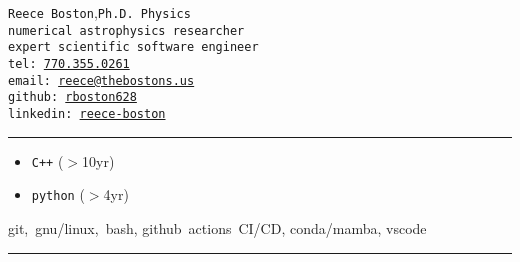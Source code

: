 \documentclass[11pt, letter]{article}
\begin{document}
\begin{multicols}{2}
 \noindent %
 {\tt \huge  Reece Boston},\hfill{\tt \large Ph.D.~Physics}\\
	{\tt\small numerical astrophysics researcher\hfill\drawplanet}\\
	{\tt\small expert scientific software engineer\hfill\drawcalculator\hspace{1pt}\mbox{}}
%
 \columnbreak\\
 \mbox{}\hfill{\tt \small tel: \href{tel:770-355-0261}{770.355.0261}\hphantom{aaaaaaa}}\\  %
 \mbox{}\hfill{\tt \small email: \href{mailto:Reece@thebostons.us}{reece@thebostons.us}}\\ %
 \mbox{}\hfill{\tt \small github: \href{https://github.com/rboston628}{rboston628}\hphantom{aaaaaaaaa}}\\%
 \mbox{}\hfill{\tt \small linkedin: \href{https://www.linkedin.com/in/reece-boston-752046117/}{reece-boston}\hphantom{aaaaaaa}}%
\end{multicols}

\hrule
\vspace{-0.5\baselineskip}
\begin{multicols}{3}
\begin{itemize}
	\item {\tt C++} ($>$10yr)\\
\columnbreak
	\item {\tt python} ($>$4yr)\\
\end{itemize}
\columnbreak
{ git,~gnu/linux,~bash, \mbox{github actions CI/CD}, conda/mamba, \mbox{vscode}}
\end{multicols}
\vspace{-0.5\baselineskip}
\hrule
\vspace{-0.5\baselineskip}
\end{document}
